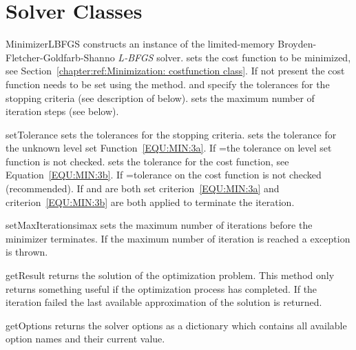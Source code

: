 \section{Solver Classes}

\begin{classdesc}{MinimizerLBFGS}{%
%
%
%
}
constructs an instance of the limited-memory Broyden-Fletcher-Goldfarb-Shanno \emph{L-BFGS} solver.
 sets the cost function to be minimized, see Section~\ref{chapter:ref:Minimization: costfunction class}.
If not present the cost function needs to be set using the  method.
 and  specify the tolerances for the stopping
criteria (see description of  below).
 sets the maximum number of iteration steps (see
 below).
\end{classdesc}

\begin{methoddesc}[MinimizerLBFGS]{setTolerance}{}
sets the tolerances for the stopping criteria. 
 sets the tolerance for the unknown level set Function~\ref{EQU:MIN:3a}.
If =\None the tolerance on level set function is not checked.
 sets the tolerance for the cost function, see Equation~\ref{EQU:MIN:3b}.
If =\None tolerance on the cost function is not checked (recommended).
If  and  are both set criterion~\ref{EQU:MIN:3a}
and criterion~\ref{EQU:MIN:3b} are both applied to terminate the iteration.
\end{methoddesc}

\begin{methoddesc}[MinimizerLBFGS]{setMaxIterations}{imax}
sets the maximum number of iterations before the minimizer terminates. If 
the maximum number of iteration is reached a 
exception is thrown.
\end{methoddesc}

\begin{methoddesc}[MinimizerLBFGS]{getResult}{}
returns the solution of the optimization problem.
This method only returns something useful if the optimization process has
completed.
If the iteration failed the last available approximation of the solution is
returned.
\end{methoddesc}

\begin{methoddesc}[MinimizerLBFGS]{getOptions}{}
returns the solver options as a dictionary which contains all available option
names and their current value.
\end{methoddesc}

